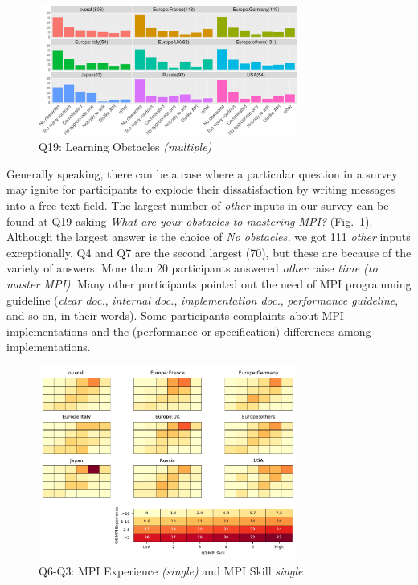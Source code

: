 \documentclass[preprint,5p,times]{elsarticle}
\def\myquote#1{{\it #1}}
\begin{document}
\begin{figure}[htb]
\begin{center}
\includegraphics[width=8.5cm]{R-scripts/Q19.pdf}
\caption{Q19: Learning Obstacles {\it(multiple)}}
\label{fig:learning-obstacles}
\end{center}
\end{figure}

Generally speaking, there can be a case where a particular question in
a survey may ignite for participants to explode their dissatisfaction
by writing messages into a free text field.
The largest number of \myquote{other} inputs in our survey can be found
at Q19 asking \myquote{What are your obstacles to mastering MPI?}
(Fig.~\ref{fig:learning-obstacles}). Although the largest answer is
the choice of \myquote{No obstacles,} we got 111 \myquote{other} inputs
exceptionally. Q4 and Q7 are the second largest (70), but these are
because of the variety of answers.
More than 20 participants answered \myquote{other} raise
\myquote{time (to master MPI)}. Many other participants pointed
out the need of MPI programming guideline (\myquote{clear doc.},
\myquote{internal doc.}, \myquote{implementation
  doc.}, \myquote{performance guideline}, and so on, in their words).
Some participants complaints about MPI implementations and the
(performance or specification) differences among implementations.

\begin{figure}[htb]
\begin{center}
\includegraphics[width=8.5cm]{Figs/Q6-Q3.pdf}
\caption{Q6-Q3: MPI Experience {\it(single)} and MPI Skill {\it single}}
\label{fig:experience-and-skill}
\end{center}
\end{figure}
\end{document}
